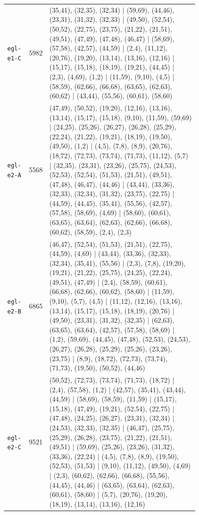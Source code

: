 \begin{landscape}
\begin{longtable}{lr>{\tiny\raggedright\arraybackslash}p{0.78\linewidth}}
\texttt{egl-e1-C} & 5982 & (35,41), (32,35), (32,34) | (59,69), (44,46), (23,31), (31,32), (32,33) | (49,50), (52,54), (50,52), (22,75), (23,75), (21,22), (21,51), (49,51), (47,49), (47,48), (46,47) | (58,69), (57,58), (42,57), (44,59) | (2,4), (11,12), (20,76), (19,20), (13,14), (13,16), (12,16) | (15,17), (15,18), (18,19), (19,21), (44,45) | (2,3), (4,69), (1,2) | (11,59), (9,10), (4,5) | (58,59), (62,66), (66,68), (63,65), (62,63), (60,62) | (43,44), (55,56), (60,61), (58,60) \\[2pt]
\texttt{egl-e2-A} & 5568 & (47,49), (50,52), (19,20), (12,16), (13,16), (13,14), (15,17), (15,18), (9,10), (11,59), (59,69) | (24,25), (25,26), (26,27), (26,28), (25,29), (22,24), (21,22), (19,21), (18,19), (19,50), (49,50), (1,2) | (4,5), (7,8), (8,9), (20,76), (18,72), (72,73), (73,74), (71,73), (11,12), (5,7) | (32,35), (23,31), (23,26), (25,75), (24,53), (52,53), (52,54), (51,53), (21,51), (49,51), (47,48), (46,47), (44,46) | (43,44), (33,36), (32,33), (32,34), (31,32), (23,75), (22,75) | (44,59), (44,45), (35,41), (55,56), (42,57), (57,58), (58,69), (4,69) | (58,60), (60,61), (63,65), (63,64), (62,63), (62,66), (66,68), (60,62), (58,59), (2,4), (2,3) \\[2pt]
\texttt{egl-e2-B} & 6865 & (46,47), (52,54), (51,53), (21,51), (22,75), (44,59), (4,69) | (43,44), (33,36), (32,33), (32,34), (35,41), (55,56) | (2,3), (7,8), (19,20), (19,21), (21,22), (25,75), (24,25), (22,24), (49,51), (47,49) | (2,4), (58,59), (60,61), (66,68), (62,66), (60,62), (58,60) | (11,59), (9,10), (5,7), (4,5) | (11,12), (12,16), (13,16), (13,14), (15,17), (15,18), (18,19), (20,76) | (49,50), (23,31), (31,32), (32,35) | (62,63), (63,65), (63,64), (42,57), (57,58), (58,69) | (1,2), (59,69), (44,45), (47,48), (52,53), (24,53), (26,27), (26,28), (25,29), (25,26), (23,26), (23,75) | (8,9), (18,72), (72,73), (73,74), (71,73), (19,50), (50,52), (44,46) \\[2pt]
\texttt{egl-e2-C} & 9521 & (50,52), (72,73), (73,74), (71,73), (18,72) | (2,4), (57,58), (1,2) | (42,57), (35,41), (43,44), (44,59) | (58,69), (58,59), (11,59) | (15,17), (15,18), (47,49), (19,21), (52,54), (22,75) | (47,48), (24,25), (26,27), (23,31), (32,34) | (24,53), (32,33), (32,35) | (46,47), (25,75), (25,29), (26,28), (23,75), (21,22), (21,51), (49,51) | (59,69), (25,26), (23,26), (31,32), (33,36), (22,24) | (4,5), (7,8), (8,9), (19,50), (52,53), (51,53) | (9,10), (11,12), (49,50), (4,69) | (2,3), (60,62), (62,66), (66,68), (55,56), (44,45), (44,46) | (63,65), (63,64), (62,63), (60,61), (58,60) | (5,7), (20,76), (19,20), (18,19), (13,14), (13,16), (12,16) \\[2pt]

\end{longtable}
\end{landscape}
